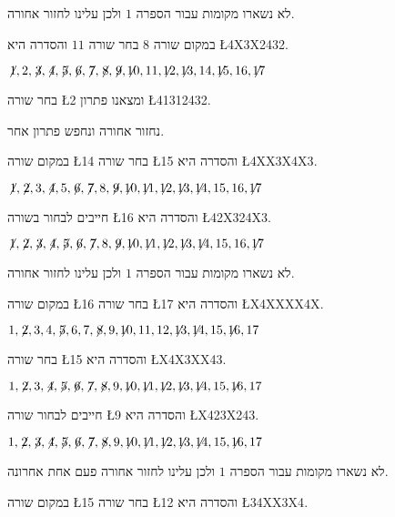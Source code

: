 \noindent
לא נשארו מקומות עבור הספרה $1$ ולכן עלינו לחזור אחורה.

\smallskip

\noindent 
במקום שורה $8$ בחר שורה $11$ והסדרה היא
\L{4X3X2432}.


$\not\! 1,2,\not\! 3,\not\! 4,\not\! 5,\not\! 6,\not\! 7,\not\! 8,\not\! 9,\not\!\! 10,11,\not\!\! 12,\not\!\! 13,14, \not\!\! 15,16,\not\!\! 17$

\noindent
בחר שורה
\L{2}
ומצאנו פתרון
\L{41312432}.

\smallskip

\noindent
נחזור אחורה ונחפש פתרון אחר.

\smallskip

\noindent
במקום שורה
\L{14}
בחר שורה
\L{15}
והסדרה היא
\L{4XX3X4X3}.

$\not\! 1,\not\! 2,3,\not\! 4,5,\not\! 6,\not\! 7,8,\not\! 9,\not\!\! 10,\not\!\! 11,\not\!\! 12,\not\!\! 13,\not\!\! 14,15,16,\not\!\! 17$

\noindent 
חייבים לבחור בשורה
\L{16}
והסדרה היא
\L{42X324X3}.

$\not\! 1,\not\! 2,\not\! 3,\not\! 4,\not\! 5,\not\! 6,\not\! 7,8,\not\! 9,\not\!\! 10,\not\!\! 11,\not\!\! 12,\not\!\! 13,\not\!\! 14,15,16,\not\!\! 17$

\noindent
לא נשארו מקומות עבור הספרה $1$ ולכן עלינו לחזור אחורה.

\smallskip

\noindent
במקום שורה
\L{16}
בחר שורה
\L{17}
והסדרה היא
\L{X4XXXX4X}.

$1,\not\! 2,3,4,\not\! 5,6,7,\not\! 8,9,\not\!\! 10,11,12,\not\!\! 13,\not\!\! 14,15,\not\!\! 16,17$

\noindent 
בחר שורה
\L{15}
והסדרה היא
\L{X4X3XX43}.

$1,\not\! 2,3,\not\! 4,\not\! 5,\not\! 6,\not\! 7,\not\! 8,9,\not\!\! 10,\not\!\! 11,\not\!\! 12,\not\!\! 13,\not\!\! 14,15,\not\!\! 16,17$

\noindent 
חייבים לבחור שורה
\L{9}
והסדרה היא
\L{X423X243}.

$1,\not\! 2,\not\! 3,\not\! 4,\not\! 5,\not\! 6,\not\! 7,\not\! 8,9,\not\!\! 10,\not\!\! 11,\not\!\! 12,\not\!\! 13,\not\!\! 14,15,\not\!\! 16,17$

\noindent
לא נשארו מקומות עבור הספרה $1$ ולכן עלינו לחזור אחורה פעם אחת אחרונה.

\smallskip

\noindent
במקום שורה
\L{15}
בחר שורה
\L{12}
והסדרה היא
\L{34XX3X4}.


